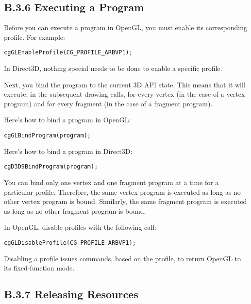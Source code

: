 \documentclass[../main.tex]{subfiles}
\begin{document}
\subsection{B.3.6 Executing a Program}

Before you can execute a program in OpenGL, you must enable its corresponding profile. For example:

\FloatBarrier
\begin{lstlisting}
cgGLEnableProfile(CG_PROFILE_ARBVP1);
\end{lstlisting}
\FloatBarrier

In Direct3D, nothing special needs to be done to enable a specific profile.

Next, you bind the program to the current 3D API state. This means that it will execute, in the subsequent drawing calls, for every vertex (in the case of a vertex program) and for every fragment (in the case of a fragment program).

Here's how to bind a program in OpenGL:

\FloatBarrier
\begin{lstlisting}
cgGLBindProgram(program);
\end{lstlisting}
\FloatBarrier

Here's how to bind a program in Direct3D:

\FloatBarrier
\begin{lstlisting}
cgD3D9BindProgram(program);
\end{lstlisting}
\FloatBarrier

You can bind only one vertex and one fragment program at a time for a particular profile. Therefore, the same vertex program is executed as long as no other vertex program is bound. Similarly, the same fragment program is executed as long as no other fragment program is bound.

In OpenGL, disable profiles with the following call:

\FloatBarrier
\begin{lstlisting}
cgGLDisableProfile(CG_PROFILE_ARBVP1);
\end{lstlisting}
\FloatBarrier

Disabling a profile issues commands, based on the profile, to return OpenGL to its fixed-function mode.

\subsection{B.3.7 Releasing Resources}
\end{document}
